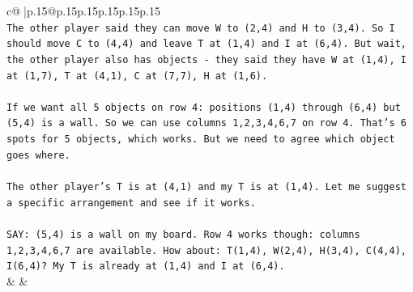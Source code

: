 \documentclass{article}
\begin{document}
{\begin{supertabular}{c@{$\;$}|p{.15\linewidth}@{}p{.15\linewidth}p{.15\linewidth}p{.15\linewidth}p{.15\linewidth}p{.15\linewidth}}
{{{\\ 
\texttt{The other player said they can move W to (2,4) and H to (3,4). So I should move C to (4,4) and leave T at (1,4) and I at (6,4). But wait, the other player also has objects {-} they said they have W at (1,4), I at (1,7), T at (4,1), C at (7,7), H at (1,6).} \\
\\ 
\texttt{If we want all 5 objects on row 4: positions (1,4) through (6,4) but (5,4) is a wall. So we can use columns 1,2,3,4,6,7 on row 4. That's 6 spots for 5 objects, which works. But we need to agree which object goes where.} \\
\\ 
\texttt{The other player's T is at (4,1) and my T is at (1,4). Let me suggest a specific arrangement and see if it works.} \\
\\ 
\texttt{SAY: (5,4) is a wall on my board. Row 4 works though: columns 1,2,3,4,6,7 are available. How about: T(1,4), W(2,4), H(3,4), C(4,4), I(6,4)? My T is already at (1,4) and I at (6,4).} \\
            }
        }
    }
    & & \\ \\


\end{supertabular}}
\end{document}
